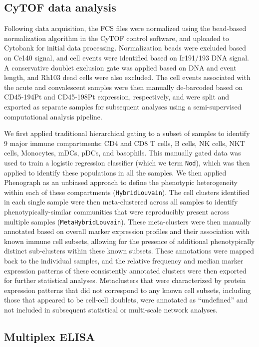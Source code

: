 \subsection{CyTOF data analysis}

Following data acquisition, the FCS files were normalized using the bead-based normalization algorithm in the CyTOF control software, and uploaded to Cytobank for initial data processing. Normalization beads were excluded based on Ce140 signal, and cell events were identified based on Ir191/193 DNA signal. A conservative doublet exclusion gate was applied based on DNA and event length, and Rh103\sups{+} dead cells were also excluded. The cell events associated with the acute and convalescent samples were then manually de-barcoded based on CD45-194Pt and CD45-198Pt expression, respectively, and were split and exported as separate samples for subsequent analyses using a semi-supervised computational analysis pipeline. 

We first applied traditional hierarchical gating to a subset of samples to identify 9 major immune compartments: CD4\sups{+} and CD8\sups{+} T cells, B cells, NK cells, NKT cells, Monocytes, mDCs, pDCs, and basophils. This manually gated data was used to train a logistic regression classifier (which we term \texttt{Nod}), which was then applied to identify these populations in all the samples. We then applied Phenograph\autocite{Levine2015a} as an unbiased approach to define the phenotypic heterogeneity within each of these compartments (\texttt{HybridLouvain}). The cell clusters identified in each single sample were then meta-clustered across all samples to identify phenotypically-similar communities that were reproducibly present across multiple samples (\texttt{MetaHybridLouvain}). These meta-clusters were then manually annotated based on overall marker expression profiles and their association with known immune cell subsets, allowing for the presence of additional phenotypically distinct sub-clusters within these known subsets. These annotations were mapped back to the individual samples, and the relative frequency and median marker expression patterns of these consistently annotated clusters were then exported for further statistical analyses. Metaclusters that were characterized by protein expression patterns that did not correspond to any known cell subsets, including those that appeared to be cell-cell doublets, were annotated as “undefined” and not included in subsequent statistical or multi-scale network analyses.

\subsection{Multiplex ELISA}

